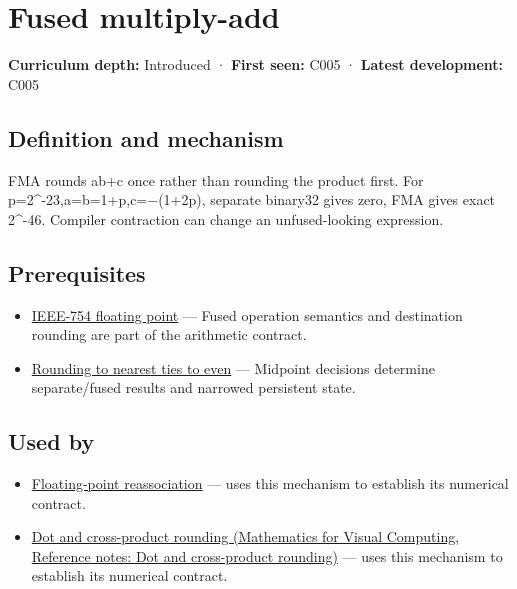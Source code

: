 \hypertarget{appendix-41e8ef22a21e}{}\label{referencestart:appendix-41e8ef22a21e}
\section{Fused multiply-add}\label{appendix-41e8ef22a21e-fused-multiply-add}

\textbf{Curriculum depth:} Introduced · \textbf{First seen:} C005 · \textbf{Latest development:} C005

\begin{allmightroledefinition}

\subsection{Definition and mechanism}\label{appendix-41e8ef22a21e-definition-and-mechanism}

FMA rounds ab+c once rather than rounding the product first. For p=2\^{}-23,a=b=1+p,c=−(1+2p), separate binary32 gives zero, FMA gives exact 2\^{}-46. Compiler contraction can change an unfused-looking expression.

\end{allmightroledefinition}

\subsection{Prerequisites}\label{appendix-41e8ef22a21e-prerequisites}

\begin{itemize}
\tightlist
\item
  \hyperref[appendix-343615f49ddf]{IEEE-754 floating point} --- Fused operation semantics and destination rounding are part of the arithmetic contract.
\item
  \hyperref[appendix-614afe1de592]{Rounding to nearest ties to even} --- Midpoint decisions determine separate/fused results and narrowed persistent state.
\end{itemize}

\subsection{Used by}\label{appendix-41e8ef22a21e-used-by}

\begin{itemize}
\tightlist
\item
  \hyperref[appendix-c2ac4a84c283]{Floating-point reassociation} --- uses this mechanism to establish its numerical contract.
\item
  \href{../02-Mathematics-for-Visual-Computing/main.pdf\#nameddest=appendix-5aef4f13483a}{Dot and cross-product rounding (Mathematics for Visual Computing, Reference notes: Dot and cross-product rounding)} --- uses this mechanism to establish its numerical contract.
\end{itemize}

